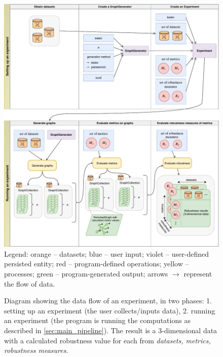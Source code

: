 \begin{figure}
    \includegraphics[width=\linewidth]{main_data_flow.pdf}
    \footnotesize\justify\vspace{-0.4\baselineskip}
    Legend: \textcolor{diag-orange}{orange} -- datasets; \textcolor{diag-blue}{blue} -- user input; \textcolor{diag-violet}{violet} -- user-defined persisted entity; \textcolor{diag-red}{red} -- program-defined operations; \textcolor{diag-yellow}{yellow} -- processes; \textcolor{diag-green}{green} -- program-generated output; arrows $\rightarrow$ represent the flow of data.
    \vspace*{5mm}
    \caption{Diagram showing the data flow of an experiment, in two phases: 1. setting up an experiment (the user collects/inputs data), 2. running an experiment (the program is running the computations as described in \autoref{sec:main_pipeline}). The result is a 3-dimensional data with a calculated robustness value for each from \textsl{datasets, metrics, robustness measures}.}\label{fig:main_data_flow}
\end{figure}
